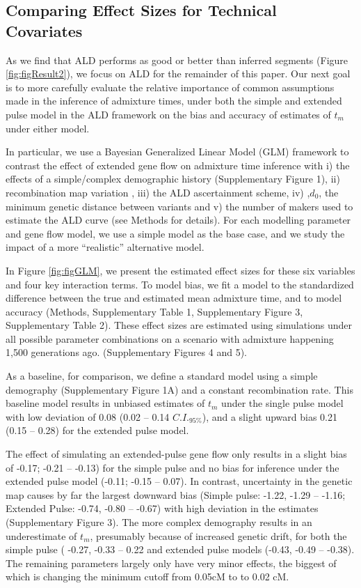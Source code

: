 \documentclass[11pt]{article}
\begin{document}
\subsection{Comparing Effect Sizes for Technical Covariates}\label{comparing effect sizes}

As we find that ALD performs as good or better than inferred segments (Figure \ref{fig:figResult2}), we focus on ALD for the remainder of this paper. Our next goal is to more carefully evaluate the relative importance of common assumptions made in the inference of admixture times, under both the simple and extended pulse model in the ALD framework on the bias and accuracy of estimates of $t_m$ under either model.

In particular, we use a Bayesian Generalized Linear Model (GLM) framework to contrast the effect of extended gene flow on admixture time inference with i) the effects of a simple/complex demographic history (Supplementary Figure 1), ii) recombination map variation , iii)  the ALD ascertainment scheme,  iv) ,$d_0$, the minimum genetic distance between variants and v) the number of makers used to estimate the ALD curve (see Methods for details). For each modelling parameter and gene flow model, we use a simple model as the base case, and we study the impact of a more ``realistic'' alternative model.

In Figure \ref{fig:figGLM}, we present the estimated effect sizes for these six variables and four key interaction terms. To model bias, we fit a model to the standardized difference between the true and estimated mean admixture time, and to model accuracy (Methods, Supplementary Table 1, Supplementary Figure 3, Supplementary Table 2). These effect sizes are estimated using simulations under all possible parameter combinations on a scenario with admixture happening 1,500 generations ago. (Supplementary Figures 4 and 5).

As a baseline, for comparison, we define a standard model using a simple demography (Supplementary Figure 1A) and a constant recombination rate.  This baseline model results in unbiased estimates of $t_m$ under the single pulse model with low deviation  of 0.08 (0.02 -- 0.14 $C.I._{95\%}$), and a slight upward bias 0.21 (0.15 -- 0.28) for the extended pulse model.

The effect of simulating an extended-pulse gene flow only results in a slight bias of -0.17; -0.21 -- -0.13) for the simple pulse and no bias for inference under the extended pulse model (-0.11; -0.15 -- 0.07). In contrast, uncertainty in the genetic map causes by far the largest downward bias (Simple pulse: -1.22, -1.29 -- -1.16; Extended Pulse: -0.74, -0.80 -- -0.67) with high deviation in the estimates (Supplementary Figure 3). The more complex demography results in an underestimate of $t_m$, presumably because of increased genetic drift, for both the simple pulse ( -0.27, -0.33 -- 0.22 and extended pulse models (-0.43, -0.49 -- -0.38). The remaining parameters largely only have very minor effects, the biggest of which is changing the minimum cutoff from 0.05cM to to 0.02 cM. 
\end{document}
